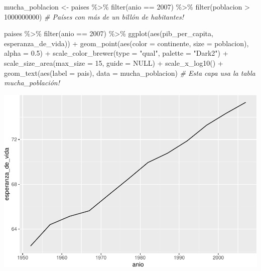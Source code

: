 \documentclass[
  openany]{book}
\newenvironment{Shaded}{\begin{snugshade}}{\end{snugshade}}
\newcommand{\AttributeTok}[1]{\textcolor[rgb]{0.77,0.63,0.00}{#1}}
\newcommand{\CommentTok}[1]{\textcolor[rgb]{0.56,0.35,0.01}{\textit{#1}}}
\newcommand{\ConstantTok}[1]{\textcolor[rgb]{0.00,0.00,0.00}{#1}}
\newcommand{\DecValTok}[1]{\textcolor[rgb]{0.00,0.00,0.81}{#1}}
\newcommand{\FloatTok}[1]{\textcolor[rgb]{0.00,0.00,0.81}{#1}}
\newcommand{\FunctionTok}[1]{\textcolor[rgb]{0.00,0.00,0.00}{#1}}
\newcommand{\NormalTok}[1]{#1}
\newcommand{\OtherTok}[1]{\textcolor[rgb]{0.56,0.35,0.01}{#1}}
\newcommand{\SpecialCharTok}[1]{\textcolor[rgb]{0.00,0.00,0.00}{#1}}
\newcommand{\StringTok}[1]{\textcolor[rgb]{0.31,0.60,0.02}{#1}}
\begin{document}
\begin{Shaded}
\begin{Highlighting}[]
\NormalTok{mucha\_poblacion }\OtherTok{\textless{}{-}}\NormalTok{ paises }\SpecialCharTok{\%\textgreater{}\%} 
  \FunctionTok{filter}\NormalTok{(anio }\SpecialCharTok{==} \DecValTok{2007}\NormalTok{) }\SpecialCharTok{\%\textgreater{}\%} 
  \FunctionTok{filter}\NormalTok{(poblacion }\SpecialCharTok{\textgreater{}} \DecValTok{1000000000}\NormalTok{) }\CommentTok{\# Países con más de un billón de habitantes!}

\NormalTok{paises }\SpecialCharTok{\%\textgreater{}\%} 
  \FunctionTok{filter}\NormalTok{(anio }\SpecialCharTok{==} \DecValTok{2007}\NormalTok{) }\SpecialCharTok{\%\textgreater{}\%} 
  \FunctionTok{ggplot}\NormalTok{(}\FunctionTok{aes}\NormalTok{(pib\_per\_capita, esperanza\_de\_vida)) }\SpecialCharTok{+}
  \FunctionTok{geom\_point}\NormalTok{(}\FunctionTok{aes}\NormalTok{(}\AttributeTok{color =}\NormalTok{ continente, }\AttributeTok{size =}\NormalTok{ poblacion), }\AttributeTok{alpha =} \FloatTok{0.5}\NormalTok{) }\SpecialCharTok{+}
  \FunctionTok{scale\_color\_brewer}\NormalTok{(}\AttributeTok{type =} \StringTok{"qual"}\NormalTok{, }\AttributeTok{palette =} \StringTok{"Dark2"}\NormalTok{) }\SpecialCharTok{+}
  \FunctionTok{scale\_size\_area}\NormalTok{(}\AttributeTok{max\_size =} \DecValTok{15}\NormalTok{, }\AttributeTok{guide =} \ConstantTok{NULL}\NormalTok{) }\SpecialCharTok{+}
  \FunctionTok{scale\_x\_log10}\NormalTok{() }\SpecialCharTok{+}
  \FunctionTok{geom\_text}\NormalTok{(}\FunctionTok{aes}\NormalTok{(}\AttributeTok{label =}\NormalTok{ pais), }
            \AttributeTok{data =}\NormalTok{ mucha\_poblacion)  }\CommentTok{\# Esta capa usa la tabla mucha\_población!}
\end{Highlighting}
\end{Shaded}

\begin{center}\includegraphics[width=1\linewidth]{DT6_files/figure-latex/unnamed-chunk-104-1} \end{center}
\end{document}
